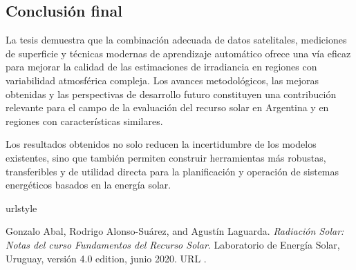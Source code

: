 \documentclass[letterpaper,12pt, twoside]{report}
\makeatletter
\let\newtitle\@title
\providecommand{\DIFdeltex}[1]{{\protect\color{red} \scriptsize #1}} %
\providecommand{\DIFaddbegin}{} %
\providecommand{\DIFaddend}{} %
\providecommand{\DIFdelbegin}{} %
\providecommand{\DIFdelend}{} %
\providecommand{\DIFdel}[1]{\texorpdfstring{\DIFdeltex{#1}}{}} %
\newcommand{\DIFscaledelfig}{0.5}
\newlength{\DIFdelgraphicswidth} %
\newlength{\DIFdelgraphicsheight} %
\newcommand{\DIFaddincludegraphics}[2][]{{\color{blue}\fbox{\DIFOincludegraphics[#1]{#2}}}} %
\newcommand{\DIFdelincludegraphics}[2][]{%
\sbox{\DIFdelgraphicsbox}{\DIFOincludegraphics[#1]{#2}}%
\settoboxwidth{\DIFdelgraphicswidth}{\DIFdelgraphicsbox} %
\settoboxtotalheight{\DIFdelgraphicsheight}{\DIFdelgraphicsbox} %
\scalebox{\DIFscaledelfig}{%
\parbox[b]{\DIFdelgraphicswidth}{\usebox{\DIFdelgraphicsbox}\\[-\baselineskip] \rule{\DIFdelgraphicswidth}{0em}}\llap{\resizebox{\DIFdelgraphicswidth}{\DIFdelgraphicsheight}{%
\setlength{\unitlength}{\DIFdelgraphicswidth}%
\begin{picture}(1,1)%
\thicklines\linethickness{2pt} %
{\color[rgb]{1,0,0}\put(0,0){\framebox(1,1){}}}%
{\color[rgb]{1,0,0}\put(0,0){\line( 1,1){1}}}%
{\color[rgb]{1,0,0}\put(0,1){\line(1,-1){1}}}%
\end{picture}%
}\hspace*{3pt}}} %
} %
\DeclareRobustCommand{\DIFaddbegin}{\DIFOaddbegin \let\includegraphics\DIFaddincludegraphics} %
\DeclareRobustCommand{\DIFaddend}{\DIFOaddend \let\includegraphics\DIFOincludegraphics} %
\DeclareRobustCommand{\DIFdelbegin}{\DIFOdelbegin \let\includegraphics\DIFdelincludegraphics} %
\DeclareRobustCommand{\DIFdelend}{\DIFOaddend \let\includegraphics\DIFOincludegraphics} %
\makeatother
\begin{document}
\subsection{\DIFdel{Conclusión final}}
\addtocounter{subsection}{-1}%

\DIFdel{La tesis demuestra que la combinación adecuada de datos satelitales, mediciones de superficie y técnicas modernas de aprendizaje automático ofrece una vía eficaz para mejorar la calidad de las estimaciones de irradiancia en regiones con variabilidad atmosférica compleja. Los avances metodológicos, las mejoras obtenidas y las perspectivas de desarrollo futuro constituyen una contribución relevante para el campo de la evaluación del recurso solar en Argentina y en regiones con características similares.
}%

\DIFdel{Los resultados obtenidos no solo reducen la incertidumbre de los modelos existentes, sino que también permiten construir herramientas más robustas, transferibles y de utilidad directa para la planificación y operación de sistemas energéticos basados en la energía solar.
}%

\DIFdelend \DIFaddbegin  \DIFaddend %
\DIFdelbegin %


\DIFdel{urlstyle}%

\DIFdel{Gonzalo Abal, Rodrigo Alonso-Suárez, and Agustín Laguarda.
}%
\DIFdel{\emph{Radiación Solar: Notas del curso Fundamentos del Recurso
  Solar}.
}%
\DIFdel{Laboratorio de Energía Solar, Uruguay, versión 4.0 edition, junio
  2020.
}%
\DIFdel{URL }%
\DIFdel{.
}%
\end{document}
